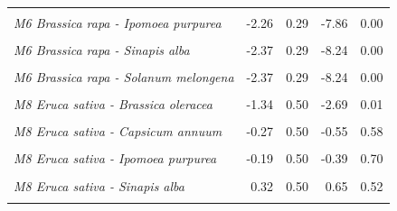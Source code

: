 \documentclass[12pt,]{article}
\begin{document}
\begin{longtable}[t]{>{}lrrrr}
\addlinespace
\em{\cellcolor{gray!6}{M6 Brassica rapa - Ipomoea aquatica}} & \cellcolor{gray!6}{-1.92} & \cellcolor{gray!6}{0.29} & \cellcolor{gray!6}{-6.67} & \cellcolor{gray!6}{0.00}\\
\addlinespace
\em{M6 Brassica rapa - Ipomoea purpurea} & -2.26 & 0.29 & -7.86 & 0.00\\
\addlinespace
\em{\cellcolor{gray!6}{M6 Brassica rapa - Petunia integrifolia}} & \cellcolor{gray!6}{-2.37} & \cellcolor{gray!6}{0.29} & \cellcolor{gray!6}{-8.24} & \cellcolor{gray!6}{0.00}\\
\addlinespace
\em{M6 Brassica rapa - Sinapis alba} & -2.37 & 0.29 & -8.24 & 0.00\\
\addlinespace
\em{\cellcolor{gray!6}{M6 Brassica rapa - Solanum lycopersicum}} & \cellcolor{gray!6}{-1.88} & \cellcolor{gray!6}{0.29} & \cellcolor{gray!6}{-6.55} & \cellcolor{gray!6}{0.00}\\
\addlinespace
\em{M6 Brassica rapa - Solanum melongena} & -2.37 & 0.29 & -8.24 & 0.00\\
\addlinespace
\em{\cellcolor{gray!6}{M8 Eruca sativa - (Intercept)}} & \cellcolor{gray!6}{1.34} & \cellcolor{gray!6}{0.35} & \cellcolor{gray!6}{3.80} & \cellcolor{gray!6}{0.00}\\
\addlinespace
\em{M8 Eruca sativa - Brassica oleracea} & -1.34 & 0.50 & -2.69 & 0.01\\
\addlinespace
\em{\cellcolor{gray!6}{M8 Eruca sativa - Brassica rapa}} & \cellcolor{gray!6}{0.66} & \cellcolor{gray!6}{0.50} & \cellcolor{gray!6}{1.32} & \cellcolor{gray!6}{0.19}\\
\addlinespace
\em{M8 Eruca sativa - Capsicum annuum} & -0.27 & 0.50 & -0.55 & 0.58\\
\addlinespace
\em{\cellcolor{gray!6}{M8 Eruca sativa - Ipomoea aquatica}} & \cellcolor{gray!6}{0.87} & \cellcolor{gray!6}{0.50} & \cellcolor{gray!6}{1.75} & \cellcolor{gray!6}{0.08}\\
\addlinespace
\em{M8 Eruca sativa - Ipomoea purpurea} & -0.19 & 0.50 & -0.39 & 0.70\\
\addlinespace
\em{\cellcolor{gray!6}{M8 Eruca sativa - Petunia integrifolia}} & \cellcolor{gray!6}{0.20} & \cellcolor{gray!6}{0.50} & \cellcolor{gray!6}{0.41} & \cellcolor{gray!6}{0.68}\\
\addlinespace
\em{M8 Eruca sativa - Sinapis alba} & 0.32 & 0.50 & 0.65 & 0.52\\
\addlinespace
\em{\cellcolor{gray!6}{M8 Eruca sativa - Solanum lycopersicum}} & \cellcolor{gray!6}{-0.52} & \cellcolor{gray!6}{0.50} & \cellcolor{gray!6}{-1.04} & \cellcolor{gray!6}{0.30}\\

\end{longtable}
\end{document}
